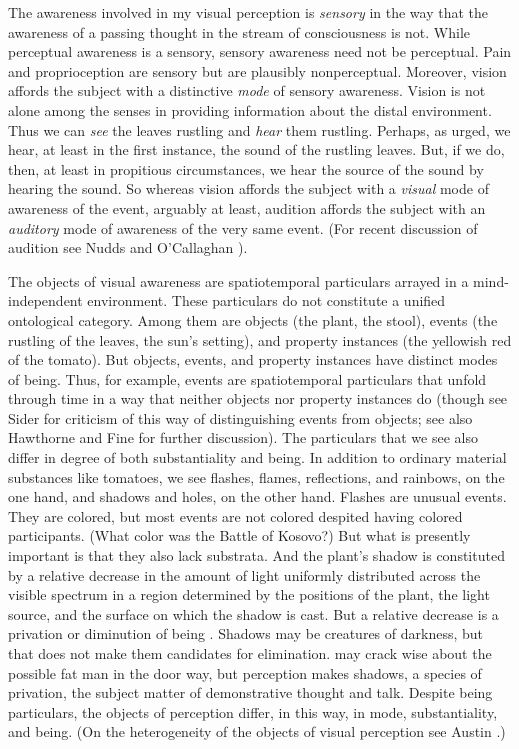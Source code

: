 \documentclass[12pt]{article}
\begin{document}
The awareness involved in my visual perception is \emph{sensory} in the way that the awareness of a passing thought in the stream of consciousness is not. While perceptual awareness is a sensory, sensory awareness need not be perceptual. Pain and proprioception are sensory but are plausibly nonperceptual. Moreover, vision affords the subject with a distinctive \emph{mode} of sensory awareness. Vision is not alone among the senses in providing information about the distal environment. Thus we can \emph{see} the leaves rustling and \emph{hear} them rustling. Perhaps, as \citet[]{Berkeley:1734fk} urged, we hear, at least in the first instance, the sound of the rustling leaves. But, if we do, then, at least in propitious circumstances, we hear the source of the sound by hearing the sound. So whereas vision affords the subject with a \emph{visual} mode of awareness of the event, arguably at least, audition affords the subject with an \emph{auditory} mode of awareness of the very same event. (For recent discussion of audition see Nudds and O'Callaghan \citeyear{Nudds:2009sk}).

The objects of visual awareness are spatiotemporal particulars arrayed in a mind-independent environment. These particulars do not constitute a unified ontological category. Among them are objects (the plant, the stool), events (the rustling of the leaves, the sun's setting), and property instances (the yellowish red of the tomato). But objects, events, and property instances have distinct modes of being. Thus, for example, events are spatiotemporal particulars that unfold through time in a way that neither objects nor property instances do (though see Sider \citeyear{Sider:1997fk} for criticism of this way of distinguishing events from objects; see also Hawthorne \citeyear{Hawthorne:2008uq} and Fine \citeyear{Fine:2006fk} for further discussion). The particulars that we see also differ in degree of both substantiality and being. In addition to ordinary material substances like tomatoes, we see flashes, flames, reflections, and rainbows, on the one hand, and shadows and holes, on the other hand. Flashes are unusual events. They are colored, but most events are not colored despited having colored participants. (What color was the Battle of Kosovo?) But what is presently important is that they also lack substrata. And the plant's shadow is constituted by a relative decrease in the amount of light uniformly distributed across the visible spectrum in a region determined by the positions of the plant, the light source, and the surface on which the shadow is cast. But a relative decrease is a privation or diminution of being \citep[see][]{Sorensen:2008kx}. Shadows may be creatures of darkness, but that does not make them candidates for elimination. \citet{Quine:1948ef} may crack wise about the possible fat man in the door way, but perception makes shadows, a species of privation, the subject matter of demonstrative thought and talk. Despite being particulars, the objects of perception differ, in this way, in mode, substantiality, and being. (On the heterogeneity of the objects of visual perception see Austin \citeyear{Austin:1962lr}.)
\end{document}
